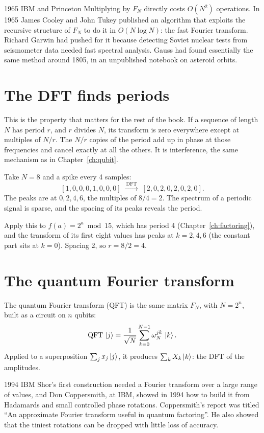 \begin{history}{1965 \textperiodcentered{} IBM and Princeton}
Multiplying by $F_N$ directly costs $O(N^2)$ operations. In 1965 James Cooley and
John Tukey published an algorithm that exploits the recursive structure of $F_N$ to
do it in $O(N\log N)$: the fast Fourier transform. Richard Garwin had pushed for it
because detecting Soviet nuclear tests from seismometer data needed fast spectral
analysis. Gauss had found essentially the same method around 1805, in an unpublished
notebook on asteroid orbits.
\end{history}

\section{The DFT finds periods}

This is the property that matters for the rest of the book. If a sequence of length
$N$ has period $r$, and $r$ divides $N$, its transform is zero everywhere except at
multiples of $N/r$. The $N/r$ copies of the period add up in phase at those
frequencies and cancel exactly at all the others. It is interference, the same
mechanism as in Chapter~\ref{ch:qubit}.

Take $N = 8$ and a spike every 4 samples:
\[
  [1, 0, 0, 0, 1, 0, 0, 0] \;\xrightarrow{\ \text{DFT}\ }\; [2, 0, 2, 0, 2, 0, 2, 0].
\]
The peaks are at $0, 2, 4, 6$, the multiples of $8/4 = 2$. The
spectrum of a periodic signal is sparse, and the spacing of its peaks reveals the
period.

Apply this to $f(a) = 2^a \bmod 15$, which has period 4 (Chapter~\ref{ch:factoring}), and the
transform of its first eight values has peaks at $k = 2, 4, 6$ (the constant part
sits at $k = 0$). Spacing 2, so $r = 8/2 = 4$.

\section{The quantum Fourier transform}

The quantum Fourier transform (QFT) is the same matrix $F_N$, with $N = 2^n$, built as
a circuit on $n$ qubits:
\[
  \mathrm{QFT}\,\ket{j} = \frac{1}{\sqrt N}\sum_{k=0}^{N-1} \omega_N^{jk}\,\ket{k}.
\]
Applied to a superposition $\sum_j x_j\ket j$, it produces $\sum_k X_k\ket k$: the DFT
of the amplitudes.

\begin{history}{1994 \textperiodcentered{} IBM}
Shor's first construction needed a Fourier transform over a large range of values,
and Don Coppersmith, at IBM, showed in 1994 how to build it from Hadamards and
small controlled phase rotations. Coppersmith's report was titled ``An approximate
Fourier transform useful in quantum factoring''. He also showed that the tiniest
rotations can be dropped with little loss of accuracy.
\end{history}

